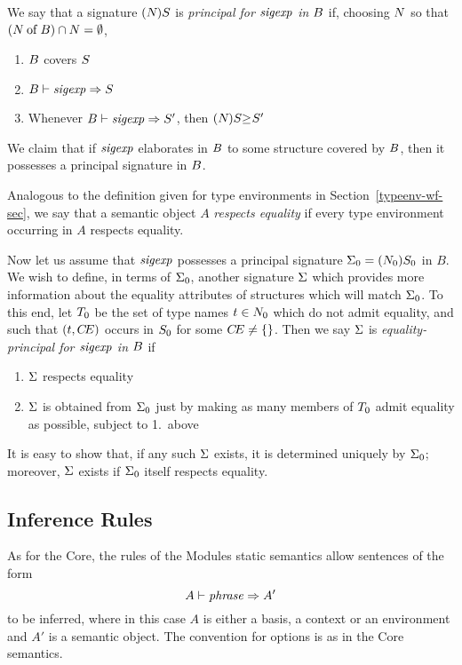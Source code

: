 We say that a signature
$\longsig{}$ is {\sl principal for $\sigexp$ in $\B$} if, choosing $\N$
so that $(\of{\N}{\B})\cap\N=\emptyset$,
\begin{enumerate}
\item $\B$ covers $\S$ 
\item $\B\vdash\sigexp\ra\S$
\item Whenever $\B\vdash\sigexp\ra\S'$, then $\sigord{\longsig{}}{}{\S'}$
\end{enumerate}
We claim that if $\sigexp$ elaborates in $\B$ to some structure covered
by $\B$, then it possesses a principal signature in $\B$.

Analogous to the definition given for type environments in
Section~\ref{typeenv-wf-sec}, we say that a semantic object $A$
{\sl respects equality} if every type environment occurring in 
$A$ respects equality. 
%
%
%

Now let us assume that $\sigexp$ possesses a principal signature
$\sig_0=\longsig{0}$ in $B$. We wish to
define, in terms of $\sig_0$, another signature $\sig$ which provides more
information about the equality attributes of structures which will
match $\sig_0$. To this end, let $\T_0$ be the set of type names $\t\in\N_0$
which do not admit equality, and such that $(\t,\CE)$ occurs in $\S_0$
for some $\CE\neq\emptymap$.  Then we say $\sig$ is 
{\sl equality-principal for $\sigexp$ in $\B$} if
\begin{enumerate}
\item
$\sig$ respects equality
\item
$\sig$ is obtained from $\sig_0$ just by making as many
members of $\T_0$ admit equality as possible, subject to 1.~above
\end{enumerate}
It is easy to show that, if any such $\sig$ exists, it is determined
uniquely by $\sig_0$; moreover, $\sig$ exists if $\sig_0$ itself
respects equality.

%
\clearpage

%
\subsection{Inference Rules}
\label{statmod-rules-sec}
As for the Core, the rules of the Modules static semantics allow
sentences of the form
\[ A\ts\phrase\ra A'\]
to be inferred, where in this case $A$ is either a basis, a context or
an environment and $A'$ is a semantic object.  The convention for options
is as in the Core semantics. 

